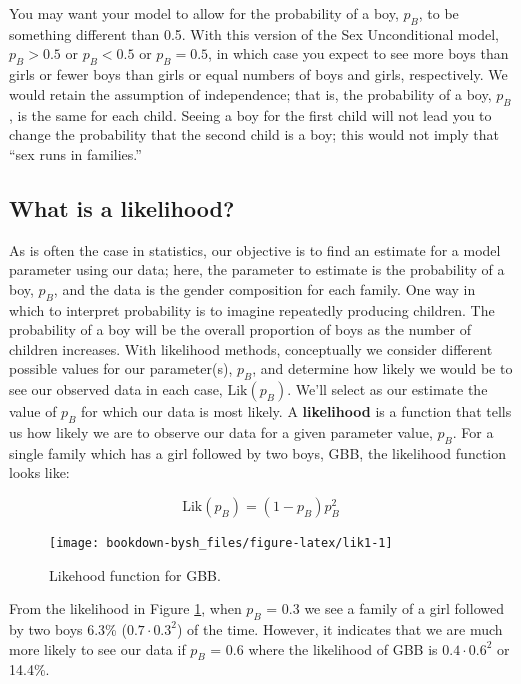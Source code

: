 \documentclass[
]{krantz}
\newcommand{\lik}{\mathrm{Lik}}
\begin{document}
You may want your model to allow for the probability of a boy, \(p_B\), to be something different than 0.5. With this version of the Sex Unconditional model, \(p_B>0.5\) or \(p_B<0.5\) or \(p_B=0.5\), in which case you expect to see more boys than girls or fewer boys than girls or equal numbers of boys and girls, respectively. We would retain the assumption of independence; that is, the probability of a boy, \(p_B\), is the same for each child. Seeing a boy for the first child will not lead you to change the probability that the second child is a boy; this would not imply that ``sex runs in families.''

\hypertarget{what-is-a-likelihood}{%
\subsection{What is a likelihood?}\label{what-is-a-likelihood}}

As is often the case in statistics, our objective is to find an estimate for a model parameter using our data; here, the parameter to estimate is the probability of a boy, \(p_B\), and the data is the gender composition for each family. One way in which to interpret probability is to imagine repeatedly producing children. The probability of a boy will be the overall proportion of boys as the number of children increases.
With likelihood methods, conceptually we consider different possible values for our parameter(s), \(p_B\), and determine how likely we would be to see our observed data in each case, \(\lik(p_B)\). We'll select as our estimate the value of \(p_B\) for which our data is most likely. A \textbf{likelihood} is a function that tells us how likely we are to observe our data for a given parameter value, \(p_B\). For a single family which has a girl followed by two boys, GBB, the likelihood function looks like:

\begin{equation}
 \lik (p_B) = (1-p_B)p_B^2
 \label{eq:GBBlik}
\end{equation}

\begin{figure}

{\centering \texttt{[image: bookdown-bysh\_files/figure-latex/lik1-1]} 

}

\caption{Likehood function for GBB.}\label{fig:lik1}
\end{figure}

From the likelihood in Figure \ref{fig:lik1}, when \(p_B\) = 0.3 we see a family of a girl followed by two boys 6.3\% (\(0.7\cdot0.3^2\)) of the time. However, it indicates that we are much more likely to see our data if \(p_B\) = 0.6 where the likelihood of GBB is \(0.4\cdot0.6^2\) or 14.4\%.
\end{document}
